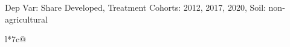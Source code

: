 \begin{table}[H]
\captionlistentry[table]{}
\label{table:beaver_land_class_DVis_land_class_3_SCg123_SSNAG}
\scriptsize %
Dep Var: Share Developed, Treatment Cohorts: 2012, 2017, 2020, Soil: non-agricultural \\
\begin{threeparttable}
\begin{tabulary}{\textwidth}{l*{7}{c}@{}}
\toprule \toprule
\noalign{\smallskip}
\noalign{\smallskip}
\midrule \bottomrule
\end{tabulary}
\medskip
\end{threeparttable}
\end{table}
